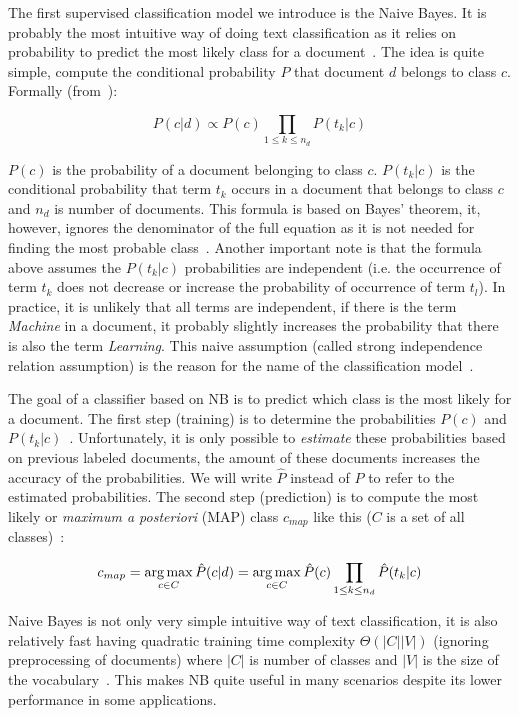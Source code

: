 The first supervised classification model we introduce is the Naive Bayes. It is probably the most intuitive way of doing text classification as it relies on probability to predict the most likely class for a document~\cite{manning2008introduction}. The idea is quite simple, compute the conditional probability $P$ that document $d$ belongs to class $c$. Formally (from~\cite{manning2008introduction}):

$$P(c|d) \propto P(c) \prod_{1 \leq k \leq n_d} P(t_k|c)$$ 

$P(c)$ is the probability of a document belonging to class $c$. $P(t_k|c)$ is the conditional probability that term $t_k$ occurs in a document that belongs to class $c$ and $n_d$ is number of documents. This formula is based on Bayes' theorem, it, however, ignores the denominator of the full equation as it is not needed for finding the most probable class~\cite{hand2001bayes}. Another important note is that the formula above assumes the $P(t_k|c)$ probabilities are independent (i.e. the occurrence of term $t_k$ does not decrease or increase the probability of occurrence of term $t_l$). In practice, it is unlikely that all terms are independent, if there is the term \textit{Machine} in a document, it probably slightly increases the probability that there is also the term \textit{Learning}. This naive assumption (called strong independence relation assumption) is the reason for the name of the classification model~\cite{hand2001bayes}.

The goal of a classifier based on NB is to predict which class is the most likely for a document. The first step (training) is to determine the probabilities $P(c)$ and $P(t_k|c)$~\cite{manning2008introduction}. Unfortunately, it is only possible to \textit{estimate} these probabilities based on previous labeled documents, the amount of these documents increases the accuracy of the probabilities. We will write $\hat{P}$ instead of $P$ to refer to the estimated probabilities. The second step (prediction) is to compute the most likely or \textit{maximum a posteriori} (MAP) class $c_{map}$ like this ($C$ is a set of all classes)~\cite{manning2008introduction}:

$$c_{map} = \operatorname*{arg\,max}_{c \in C} \hat{P}(c|d) = \operatorname*{arg\,max}_{c \in C} \hat{P}(c) \prod_{1 \leq k \leq n_d} \hat{P}(t_k|c)$$

Naive Bayes is not only very simple intuitive way of text classification, it is also relatively fast having quadratic training time complexity $\Theta(|C||V|)$ (ignoring preprocessing of documents) where $|C|$ is number of classes and $|V|$ is the size of the vocabulary~\cite{manning2008introduction}. This makes NB quite useful in many scenarios despite its lower performance in some applications.

